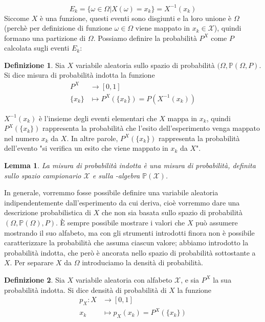 \documentclass{article}
\theoremstyle{plain}
\newtheorem{lemma}{Lemma}[section]
\theoremstyle{definition}
\newtheorem{definizione}{Definizione}[section]
\theoremstyle{remark}
\newcommand{\uline}[1]{%
  \ul{{\phantom{#1}}}%
  \llap{\contour{white}{#1}}%
}
\begin{document}
\begin{equation*}
	E_k=\{\omega\in\Omega|X(\omega)=x_k\}=X^{-1}(x_k)
\end{equation*}
Siccome $X$ è una funzione, questi eventi sono disgiunti e la loro unione è $\Omega$ (perchè per definizione di funzione \uline{ogni} $\omega\in\Omega$ viene mappato in \uline{uno e un solo} $x_k\in\mathcal{X}$), quindi formano una partizione di $\Omega$. Possiamo definire la probabilità $P^X$ come $P$ calcolata sugli eventi $E_k$:
\begin{definizione}
	Sia $X$ variabile aleatoria sullo spazio di probabilità $(\Omega,\mathds{P}(\Omega,P)$. Si dice misura di probabilità indotta la funzione
	\begin{align*}
		P^X&\to [0,1]\\
		\{x_k\}&\mapsto P^X(\{x_k\})=P(X^{-1}(x_k))
	\end{align*}
\end{definizione}
$X^{-1}(x_k)$ è l'insieme degli eventi elementari che $X$ mappa in $x_k$, quindi $P^X(\{x_k\})$ rappresenta la probabilità che l'esito dell'esperimento venga mappato nel numero $x_k$ da $X$. In altre parole, $P^X(\{x_k\})$ rappresenta la probabilità dell'evento "si verifica un esito che viene mappato in $x_k$ da $X$".
\begin{lemma}
	La misura di probabilità indotta è una misura di probabilità, definita sullo spazio campionario $\mathcal{X}$ e sulla \sigma-algebra $\mathds{P}(\mathcal{X})$.
\end{lemma}
In generale, vorremmo fosse possibile definire una variabile aleatoria indipendentemente dall'esperimento da cui deriva, cioè vorremmo dare una descrizione probabilistica di $X$ che non sia basata sullo spazio di probabilità $(\Omega, \mathds{P}(\Omega),P)$. È sempre possibile mostrare i valori che $X$ può assumere mostrando il suo alfabeto, ma con gli strumenti introdotti finora non è possibile caratterizzare la probabilità che assuma ciascun valore; abbiamo introdotto la probabilità indotta, che però è ancorata nello spazio di probabilità sottostante a $X$. Per separare $X$ da $\Omega$ introduciamo la densità di probabilità.
\begin{definizione}
	Sia $X$ variabile aleatoria con alfabeto $\mathcal{X}$, e sia $P^X$ la sua probabilità indotta. Si dice densità di probabilità di $X$ la funzione
	\begin{align*}
		p_X:X&\to[0,1]\\
		x_k&\mapsto p_X(x_k)=P^X(\{x_k\})
	\end{align*}
\end{definizione}
\end{document}
